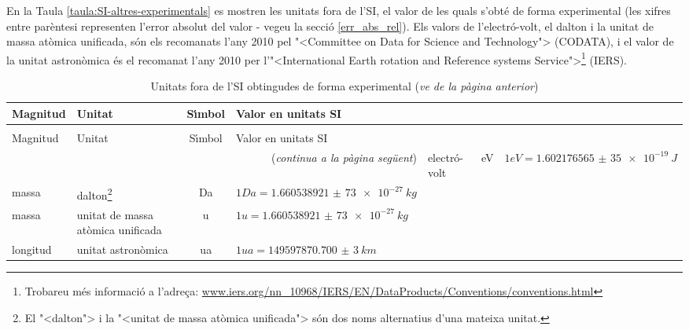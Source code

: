 En la Taula \vref{taula:SI-altres-experimentals} es mostren les unitats fora de l'SI, el valor de les quals s'obt\'{e} de forma experimental (les xifres entre par\`{e}ntesi representen l'error absolut del valor - vegeu la secci\'{o} \ref{err_abs_rel}). Els valors de l'electr\'{o}-volt, el dalton i la unitat de massa at\`{o}mica unificada, s\'{o}n els recomanats
l'any 2010 pel {"<}Committee on Data for Science and Technology{">} (\textsf{CODATA}), i el valor de la unitat astron\`{o}mica \'{e}s el recomanat l'any 2010 per l'{"<}International Earth rotation and Reference systems Service{">}\footnote{Trobareu m\'{e}s informaci\'{o} a l'adre\c{c}a: \href{http://www.iers.org/nn_10968/IERS/EN/DataProducts/Conventions/conventions.html}{www.iers.org/nn\_10968/IERS/EN/DataProducts/Conventions/conventions.html}} (\textsf{IERS}).

\begin{longtable}[h]{llcl}
   \caption{\label{taula:SI-altres-experimentals} Unitats fora de l'SI obtingudes de forma experimental }\\
   \toprule[1pt]
    Magnitud & Unitat &  S\'{\i}mbol & Valor en unitats SI\\
   \midrule
   \endfirsthead
   \caption[]{Unitats fora de l'SI obtingudes de forma experimental (\emph{ve de la p\`{a}gina
   anterior})}\\
   \toprule[1pt]
    Magnitud & Unitat &  S\'{\i}mbol & Valor en unitats SI\\
   \midrule
   \endhead
   \midrule
   \multicolumn{4}{r}{(\emph{continua a la p\`{a}gina seg\"{u}ent})}
   \endfoot
   \endlastfoot
   energia & electr\'{o}-volt & \unit{eV} & $1\unit{eV} = \SI{1,602176565(35)e-19}{J}$ \\
   massa & dalton\footnote{El {"<}dalton{">} i la {"<}unitat de massa at\`{o}mica unificada{">} s\'{o}n dos noms alternatius d'una mateixa unitat.}& Da & $1\unit{Da} = \SI{1,660538921(73)e-27}{kg}$\\
   massa & unitat de massa at\`{o}mica unificada\footnotemark[7] & u & $1\unit{u} =
    \SI{1,660538 921(73)e-27}{kg}$  \\
   longitud & unitat astron\`{o}mica &  \unit{ua} &  $1\unit{ua} =  \SI{149597870,700(3)}{km}$ \\
\bottomrule[1pt]
\end{longtable}


